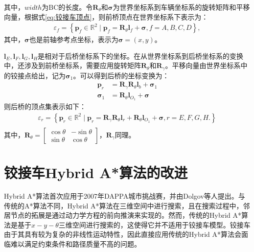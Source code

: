 \documentclass[master,academic]{ysuthesis} %
\begin{document}
	其中，$width$为BC的长度。令$\bm{R}_\theta$和$\bm{\sigma}$为世界坐标系到车辆坐标系的旋转矩阵和平移向量，根据式\ref{eq:铰接车顶点}，则前桥顶点在世界坐标系下表示为：
	\begin{equation}
	\begin{aligned}
		\varepsilon_f = \left\{ \bm{p}_f \in \mathbb{R}^2 \mid \bm{p}_f=\bm{R}_\theta \bm{l}_f+\bm{\sigma},  f = A,B,C,D \right\},
	\end{aligned} 
	\end{equation}
	其中，$\bm{\sigma}$也是前轴参考点坐标，表示为$\bm{\sigma}=(x,y)$。
	
	$\bm{l}_E,\bm{l}_F,\bm{l}_G,\bm{l}_H$是相对于后桥坐标系下的坐标。在从世界坐标系到后桥坐标系的变换中，还涉及到前桥坐标系，需要应用旋转矩阵$\bm{R}_\theta$和$\bm{R}_\gamma$。平移向量由世界坐标系中的铰接点给出，记为$\bm{\sigma}_1$。可以得到后桥的坐标变换为： 
	\begin{equation}
		\begin{aligned}
				\bm{p}_r&=\bm{R}_\gamma \bm{R}_\theta \bm{l}_b+\bm{\sigma}_1\\
				\bm{\sigma}_1&=\bm{R}_\theta \bm{l}_{O_1}+\bm{\sigma}
		\end{aligned}
	\end{equation}
	则后桥的顶点集表示如下：
	\begin{equation}
		\begin{aligned}
			\varepsilon_r = \left\{ \bm{p}_r \in \mathbb{R}^2 \mid \bm{p}_r=\bm{R}_\gamma \bm{R}_\theta \bm{l}_r+\bm{R}_\theta \bm{l}_{O_1}+\bm{\sigma},r = E,F,G,H.  \right\} \\
		\end{aligned}
	\end{equation}
	其中，$\bm{R}_\theta = \begin{bmatrix}
		\cos\theta &-\sin\theta\\
		\sin\theta &\cos\theta
	\end{bmatrix}$，$\bm{R}_\gamma$同理。

	
	\section{铰接车Hybrid A*算法的改进}
	Hybrid A*算法首次应用于2007年DAPPA城市挑战赛，并由Dolgov等人提出。与传统的A*算法不同，Hybrid A*算法在三维空间中进行搜索，且在搜索过程中，邻居节点的拓展是通过动力学方程的前向推演来实现的。然而，传统的Hybrid A*算法是基于$x-y-\theta$三维空间进行搜索的，这使得它并不适用于铰接车模型。铰接车由于其具有较为复杂的非线性运动特性，因此直接应用传统的Hybrid A*算法会面临难以满足约束条件和路径质量不高的问题。
\end{document}
